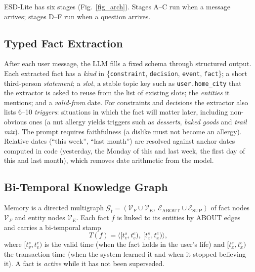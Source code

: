 \documentclass[conference]{IEEEtran}
\newcommand{\code}[1]{\texttt{\hyphenchar\font=45\relax #1}}
\begin{document}
ESD-Lite has six stages (Fig.~\ref{fig_arch}). Stages A--C run when a message arrives; stages D--F run when a question arrives.

\subsection{Typed Fact Extraction}
After each user message, the LLM fills a fixed schema through structured output. Each extracted fact has a \emph{kind} in \{\code{constraint}, \code{decision}, \code{event}, \code{fact}\}; a short third-person \emph{statement}; a \emph{slot}, a stable topic key such as \code{user.home\_city} that the extractor is asked to reuse from the list of existing slots; the \emph{entities} it mentions; and a \emph{valid-from} date. For constraints and decisions the extractor also lists 6--10 \emph{triggers}: situations in which the fact will matter later, including non-obvious ones (a nut allergy yields triggers such as \emph{desserts}, \emph{baked goods} and \emph{trail mix}). The prompt requires faithfulness (a dislike must not become an allergy). Relative dates (``this week'', ``last month'') are resolved against anchor dates computed in code (yesterday, the Monday of this and last week, the first day of this and last month), which removes date arithmetic from the model.

\subsection{Bi-Temporal Knowledge Graph}
Memory is a directed multigraph $\mathcal{G}_t = (\mathcal{V}_F \cup \mathcal{V}_E,\ \mathcal{E}_{\text{ABOUT}} \cup \mathcal{E}_{\text{SUP}})$ of fact nodes $\mathcal{V}_F$ and entity nodes $\mathcal{V}_E$. Each fact $f$ is linked to its entities by ABOUT edges and carries a bi-temporal stamp \cite{b_temporaldb,b_zep}
\begin{equation}
T(f) = \big\langle [t_v^s, t_v^e),\ [t_x^s, t_x^e) \big\rangle,
\end{equation}
where $[t_v^s, t_v^e)$ is the valid time (when the fact holds in the user's life) and $[t_x^s, t_x^e)$ the transaction time (when the system learned it and when it stopped believing it). A fact is \emph{active} while it has not been superseded.
\end{document}
